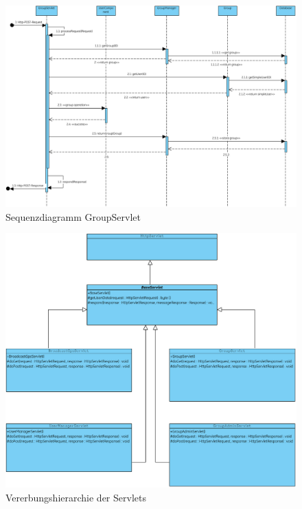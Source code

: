\begin{figure}[h]
     \centering
     \hspace*{-2cm}\includegraphics[scale=0.5, trim=2 2 2 2, clip=true]{servergraphs/sequenz-server.pdf}
     \caption{Sequenzdiagramm GroupServlet}
\end{figure}
\begin{figure}[h]
     \centering
     \hspace*{-2.9cm}\includegraphics[scale=0.7]{servergraphs/servlets.pdf}
     \caption{Vererbungshierarchie der Servlets}
\end{figure}
\clearpage
